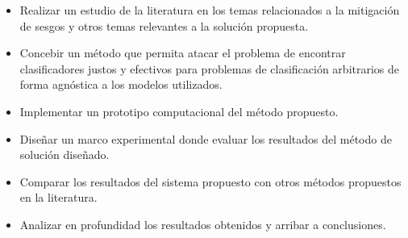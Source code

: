 \begin{itemize}
    \item Realizar un estudio de la literatura en los temas relacionados a la mitigación de sesgos y otros temas relevantes a la solución propuesta.
    \item Concebir un método que permita atacar el problema de encontrar clasificadores justos y efectivos para problemas de clasificación arbitrarios de forma agnóstica a los modelos utilizados.
    \item Implementar un prototipo computacional del método propuesto.
    \item Diseñar un marco experimental donde evaluar los resultados del método de solución diseñado.
    \item Comparar los resultados del sistema propuesto con otros métodos propuestos en la literatura.
    \item Analizar en profundidad los resultados obtenidos y arribar a conclusiones.
\end{itemize}



